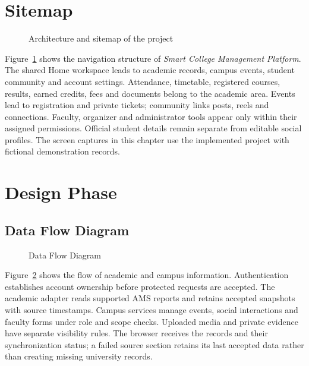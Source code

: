 \documentclass[10pt]{report}
\newcommand{\project}{\textit{\ProjectName}}
\newcommand{\ProjectName}{Smart College Management Platform}
\begin{document}
\section{Sitemap}
\begin{figure}[H]\centering
\begin{minipage}[c][70mm][c]{150mm}\centering
\resizebox{\linewidth}{!}{}
\end{minipage}
\caption{Architecture and sitemap of the project}\label{fig:sitemap}
\end{figure}
Figure~\ref{fig:sitemap} shows the navigation structure of \project. The shared Home workspace leads to academic records, campus events, student community and account settings. Attendance, timetable, registered courses, results, earned credits, fees and documents belong to the academic area. Events lead to registration and private tickets; community links posts, reels and connections. Faculty, organizer and administrator tools appear only within their assigned permissions. Official student details remain separate from editable social profiles. The screen captures in this chapter use the implemented project with fictional demonstration records.
\clearpage

\section{Design Phase}
\subsection{Data Flow Diagram}
\begin{figure}[H]\centering
\begin{minipage}[c][100mm][c]{150mm}\centering
\resizebox{\linewidth}{!}{}
\end{minipage}
\caption{Data Flow Diagram}\label{fig:dfd}
\end{figure}
Figure~\ref{fig:dfd} shows the flow of academic and campus information. Authentication establishes account ownership before protected requests are accepted. The academic adapter reads supported AMS reports and retains accepted snapshots with source timestamps. Campus services manage events, social interactions and faculty forms under role and scope checks. Uploaded media and private evidence have separate visibility rules. The browser receives the records and their synchronization status; a failed source section retains its last accepted data rather than creating missing university records.
\clearpage
\end{document}
